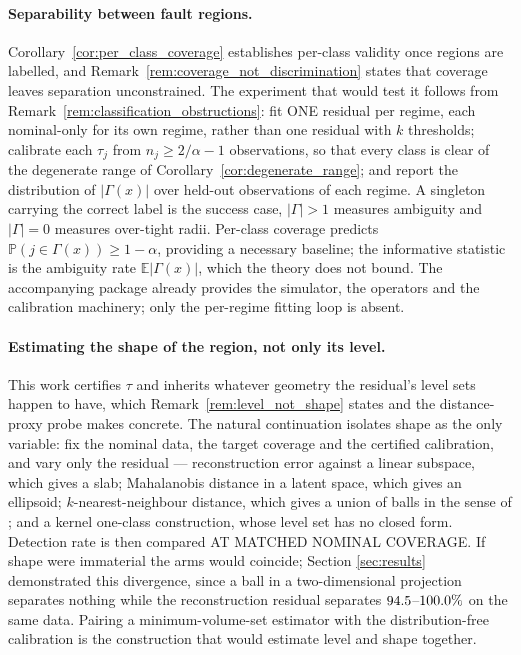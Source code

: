 \documentclass[a4paper]{cas-sc}
\newcommand{\Prob}{\ensuremath{\mathbb{P}}}
\newcommand{\Expect}{\ensuremath{\mathbb{E}}}
\begin{document}
\paragraph{Separability between fault regions.}
Corollary~\ref{cor:per_class_coverage} establishes per-class validity once
regions are labelled, and Remark~\ref{rem:coverage_not_discrimination} states
that coverage leaves separation unconstrained. The experiment that would test
it follows from Remark~\ref{rem:classification_obstructions}: fit ONE residual
per regime, each nominal-only for its own regime, rather than one residual
with \(k\) thresholds; calibrate each \(\tau_j\) from
\(n_j \ge 2/\alpha - 1\) observations, so that every class is clear of the
degenerate range of Corollary~\ref{cor:degenerate_range}; and report the
distribution of \(|\Gamma(x)|\) over held-out observations of each regime.
A singleton carrying the correct label is the success case, \(|\Gamma|>1\)
measures ambiguity and \(|\Gamma|=0\) measures over-tight radii. Per-class
coverage predicts \(\Prob(j \in \Gamma(x)) \ge 1-\alpha\), providing a necessary baseline;
the informative statistic is the ambiguity rate \(\Expect|\Gamma(x)|\),
which the theory does not bound. The accompanying package already provides the
simulator, the operators and the calibration machinery; only the per-regime
fitting loop is absent.

\paragraph{Estimating the shape of the region, not only its level.}
This work certifies \(\tau\) and inherits whatever geometry the residual's
level sets happen to have, which
Remark~\ref{rem:level_not_shape} states and the distance-proxy probe makes
concrete. The natural continuation isolates shape as the only variable: fix
the nominal data, the target coverage and the certified calibration, and vary
only the residual --- reconstruction error against a linear subspace, which
gives a slab; Mahalanobis distance in a latent space, which gives an
ellipsoid; \(k\)-nearest-neighbour distance, which gives a union of balls in
the sense of \citet{devroye1980}; and a kernel one-class construction, whose
level set has no closed form. Detection rate is then compared AT MATCHED
NOMINAL COVERAGE. If shape were immaterial the arms would coincide; Section
\ref{sec:results} demonstrated this divergence, since a ball in a two-dimensional
projection separates nothing while the reconstruction residual separates
\(94.5\)--\(100.0\%\) on the same data. Pairing a
minimum-volume-set estimator with the distribution-free calibration is the
construction that would estimate level and shape together.
\end{document}
